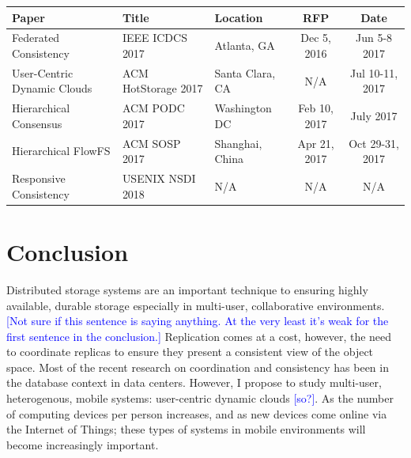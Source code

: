 \documentclass{article}
\newcommand{\pjk}[1]{{\bf
    [\marginpar[\hbox{{\textcolor{blue}{pjk}}\raisebox{0ex}{\Huge $\rightarrow$}}]%
{\hbox{\raisebox{0ex}{\Huge $\leftarrow$}{\textcolor{blue}{pjk}}}}\textcolor{blue}{#1}]}}
\renewcommand{\pjk}[1]{\textcolor{blue}{[#1]}}
\begin{document}
\begin{center}
\begin{tabular}{|l|l|l|c|c|}
\hline
Paper & Title & Location & RFP & Date \\
\hline
Federated Consistency & IEEE ICDCS 2017 & Atlanta, GA & Dec 5, 2016 & Jun 5-8 2017 \\

User-Centric Dynamic Clouds & ACM HotStorage 2017 & Santa Clara, CA & N/A & Jul 10-11, 2017 \\

Hierarchical Consensus & ACM PODC 2017 & Washington DC & Feb 10, 2017 & July 2017 \\

Hierarchical FlowFS & ACM SOSP 2017 & Shanghai, China & Apr 21, 2017 & Oct 29-31, 2017 \\

Responsive Consistency & USENIX NSDI 2018 & N/A & N/A & N/A \\

\hline
\end{tabular}
\end{center}

\section{Conclusion}

Distributed storage systems are an important technique to ensuring highly available, durable storage especially in multi-user, collaborative environments. \pjk{Not sure if this sentence is saying anything. At the very least it's weak for the first sentence in the conclusion.}
Replication comes at a cost, however, the need to coordinate replicas to ensure they present a consistent view of the object space. Most of the recent research on coordination and consistency has been in the database context in data centers. However, I propose to study multi-user, heterogenous, mobile systems: user-centric dynamic clouds \pjk{so?}. As the number of computing devices per person increases, and as new devices come online via the Internet of Things; these types of systems in mobile environments will become increasingly important.
\end{document}
